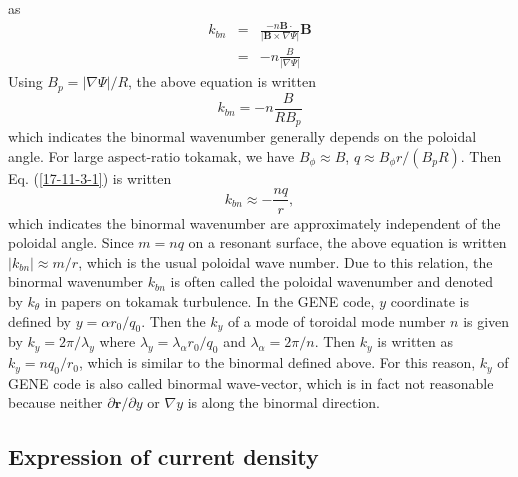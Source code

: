 \documentclass{article}
\begin{document}
as
\begin{eqnarray*}
  k_{b n} & = & \frac{- n\mathbf{B} \cdot}{| \mathbf{B} \times \nabla \Psi |}
  \mathbf{B}\\
  & = & - n \frac{B}{| \nabla \Psi |}
\end{eqnarray*}
Using $B_p = | \nabla \Psi | / R$, the above equation is written
\begin{equation}
  \label{17-11-3-1} k_{b n} = - n \frac{B}{R B_p}
\end{equation}
which indicates the binormal wavenumber generally depends on the poloidal
angle. For large aspect-ratio tokamak, we have $B_{\phi} \approx B$, $q
\approx B_{\phi} r / (B_p R)$. Then Eq. (\ref{17-11-3-1}) is written
\begin{equation}
  k_{b n} \approx - \frac{n q}{r},
\end{equation}
which indicates the binormal wavenumber are approximately independent of the
poloidal angle. Since $m = n q$ on a resonant surface, the above equation is
written $| k_{b n} | \approx m / r$, which is the usual poloidal wave number.
Due to this relation, the binormal wavenumber $k_{b n}$ is often called the
poloidal wavenumber and denoted by $k_{\theta}$ in papers on tokamak
turbulence. In the GENE code, $y$ coordinate is defined by $y = \alpha r_0 /
q_0$. Then the $k_y$ of a mode of toroidal mode number $n$ is given by $k_y =
2 \pi / \lambda_y$ where $\lambda_y = \lambda_{\alpha} r_0 / q_0$ and
$\lambda_{\alpha} = 2 \pi / n$. Then $k_y$ is written as $k_y = n q_0 / r_0$,
which is similar to the binormal defined above. For this reason, $k_y$ of GENE
code is also called binormal wave-vector, which is in fact not reasonable
because neither $\partial \mathbf{r}/ \partial y$ or $\nabla y$ is along the
binormal direction.

\subsection{Expression of current density}
\end{document}
